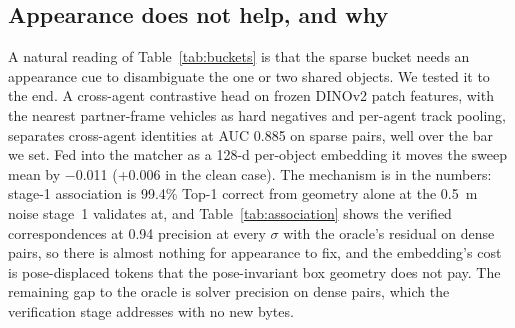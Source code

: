 \subsection{Appearance does not help, and why}
\label{sec:appearance}
\begin{table}[t]
  \centering\small
  \caption{\textbf{Cross-agent identity from appearance on \vxreal validation.} AUC of same-object against nearest-neighbour pairs; the bar for a cue to be worth transmitting was 0.80 in both buckets.}
  \label{tab:appearance}
\end{table}
A natural reading of Table~\ref{tab:buckets} is that the sparse bucket needs an appearance cue to disambiguate the one or two shared objects. We tested it to the end. A cross-agent contrastive head on frozen DINOv2 patch features, with the nearest partner-frame vehicles as hard negatives and per-agent track pooling, separates cross-agent identities at AUC 0.885 on sparse pairs, well over the bar we set. Fed into the matcher as a 128-d per-object embedding it moves the sweep mean by $-$0.011  (+0.006 in the clean case). The mechanism is in the numbers: stage-1 association is 99.4\% Top-1 correct from geometry alone at the \SI{0.5}{m} noise stage~1 validates at, and Table~\ref{tab:association} shows the verified correspondences at 0.94 precision at every $\sigma$ with the oracle's residual on dense pairs, so there is almost nothing for appearance to fix, and the embedding's cost is pose-displaced tokens that the pose-invariant box geometry does not pay. The remaining gap to the oracle is solver precision on dense pairs, which the verification stage addresses with no new bytes.
